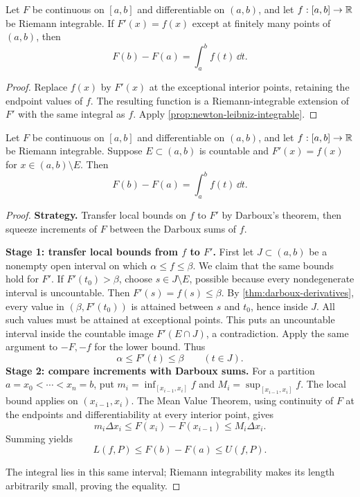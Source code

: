 \begin{theorem}
\label{thm:ftc-finite-exceptions}
Let $F$ be continuous on $[a,b]$ and differentiable on $(a,b)$, and let
$f:[a,b]\to\mathbb{R}$ be Riemann integrable. If $F'(x)=f(x)$ except at
finitely many points of $(a,b)$, then
\[
\boxed{F(b)-F(a)=\int_a^b f(t)\,\dd t.}
\]
\end{theorem}
\begin{proof}
Replace $f(x)$ by $F'(x)$ at the exceptional interior points, retaining
the endpoint values of $f$. The resulting function is a Riemann-integrable
extension of $F'$ with the same integral as $f$. Apply
\cref{prop:newton-leibniz-integrable}.
\end{proof}

\begin{theorem}
\label{thm:ftc-countable-exceptions}
Let $F$ be continuous on $[a,b]$ and differentiable on $(a,b)$, and let
$f:[a,b]\to\mathbb{R}$ be Riemann integrable. Suppose $E\subset(a,b)$ is
countable and $F'(x)=f(x)$ for $x\in(a,b)\setminus E$. Then
\[
\boxed{F(b)-F(a)=\int_a^b f(t)\,\dd t.}
\]
\end{theorem}
\begin{proof}
\textbf{Strategy.} Transfer local bounds on $f$ to $F'$ by Darboux's
theorem, then squeeze increments of $F$ between the Darboux sums of $f$.
\medskip

\textbf{Stage 1: transfer local bounds from $f$ to $F'$.}
First let $J\subset(a,b)$ be a nonempty open interval on which
$\alpha\leq f\leq\beta$. We claim that the same bounds hold for $F'$.
If $F'(t_0)>\beta$, choose $s\in J\setminus E$, possible because every
nondegenerate interval is uncountable. Then $F'(s)=f(s)\leq\beta$.
By \cref{thm:darboux-derivatives}, every value in $(\beta,F'(t_0))$
is attained between $s$ and $t_0$, hence inside $J$. All such values
must be attained at exceptional points. This puts an uncountable interval
inside the countable image $F'(E\cap J)$, a contradiction. Apply the
same argument to $-F,-f$ for the lower bound. Thus
\[
\alpha\leq F'(t)\leq\beta\qquad(t\in J).
\]
\textbf{Stage 2: compare increments with Darboux sums.}
For a partition $a=x_0<\cdots<x_n=b$, put
$m_i=\inf_{[x_{i-1},x_i]}f$ and $M_i=\sup_{[x_{i-1},x_i]}f$.
The local bound applies on $(x_{i-1},x_i)$. The Mean Value Theorem,
using continuity of $F$ at the endpoints and differentiability at every
interior point, gives
\[
m_i\Delta x_i\leq F(x_i)-F(x_{i-1})\leq M_i\Delta x_i.
\]
Summing yields
\[
L(f,P)\leq F(b)-F(a)\leq U(f,P).
\]

The integral lies in this same interval; Riemann integrability makes its
length arbitrarily small, proving the equality.
\end{proof}

